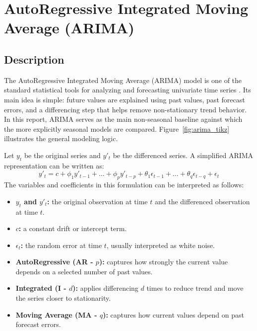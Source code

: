 %
%
%

\chapter{AutoRegressive Integrated Moving Average (ARIMA)}
\label{ch:arima}

\section{Description}
The AutoRegressive Integrated Moving Average (ARIMA) model is one of the standard statistical tools for analyzing and forecasting univariate time series \cite{Box2015,Hyndman2021}. Its main idea is simple: future values are explained using past values, past forecast errors, and a differencing step that helps remove non-stationary trend behavior. In this report, ARIMA serves as the main non-seasonal baseline against which the more explicitly seasonal models are compared. Figure~\ref{fig:arima_tikz} illustrates the general modeling logic.

Let $y_t$ be the original series and $y'_t$ be the differenced series. A simplified ARIMA representation can be written as:
\begin{equation}
    y'_t = c + \phi_1 y'_{t-1} + \dots + \phi_p y'_{t-p} + \theta_1 \epsilon_{t-1} + \dots + \theta_q \epsilon_{t-q} + \epsilon_t
\end{equation}
The variables and coefficients in this formulation can be interpreted as follows:
\begin{itemize}
    \item \textbf{$y_t$ and $y'_t$:} the original observation at time $t$ and the differenced observation at time $t$.
    \item \textbf{$c$:} a constant drift or intercept term.
    \item \textbf{$\epsilon_t$:} the random error at time $t$, usually interpreted as white noise.
    \item \textbf{AutoRegressive (AR - $p$):} captures how strongly the current value depends on a selected number of past values.
    \item \textbf{Integrated (I - $d$):} applies differencing $d$ times to reduce trend and move the series closer to stationarity.
    \item \textbf{Moving Average (MA - $q$):} captures how current values depend on past forecast errors.
\end{itemize}

